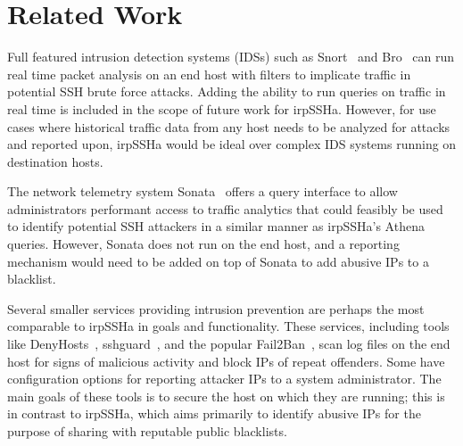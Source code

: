 \section{Related Work}
Full featured intrusion detection systems (IDSs) such as Snort~\cite{snort} and Bro~\cite{bro} can run real time packet analysis on an end host with filters to implicate traffic in potential SSH brute force attacks. Adding the ability to run queries on traffic in real time is included in the scope of future work for irpSSHa. However, for use cases where historical traffic data from any host needs to be analyzed for attacks and reported upon, irpSSHa would be ideal over complex IDS systems running on destination hosts.

The network telemetry system Sonata~\cite{sonata} offers a query interface to allow administrators performant access to traffic analytics that could feasibly be used to identify potential SSH attackers in a similar manner as irpSSHa's Athena queries. However, Sonata does not run on the end host, and a reporting mechanism would need to be added on top of Sonata to add abusive IPs to a blacklist. 

Several smaller services providing intrusion prevention are perhaps the most comparable to irpSSHa in goals and functionality. These services, including tools like DenyHosts~\cite{denyhosts}, sshguard~\cite{sshguard}, and the popular Fail2Ban~\cite{fail2ban}, scan log files on the end host for signs of malicious activity and block IPs of repeat offenders. Some have configuration options for reporting attacker IPs to a system administrator. The main goals of these tools is to secure the host on which they are running; this is in contrast to irpSSHa, which aims primarily to identify abusive IPs for the purpose of sharing with reputable public blacklists.
\label{sec:related}

